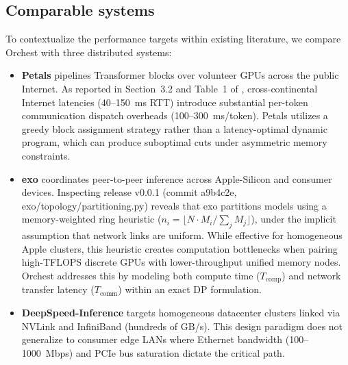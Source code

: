 \documentclass[10pt,a4paper]{article}
\newcommand{\code}[1]{{\ttfamily\footnotesize #1}}
\begin{document}
\subsection{Comparable systems}
To contextualize the performance targets within existing literature, we compare Orchest with three distributed systems:
\begin{itemize}[leftmargin=*]
\item \textbf{Petals} \cite{petals} pipelines Transformer blocks over volunteer GPUs across the public Internet. As reported in Section~3.2 and Table~1 of \cite{petals}, cross-continental Internet latencies (40--150~ms RTT) introduce substantial per-token communication dispatch overheads (100--300~ms/token). Petals utilizes a greedy block assignment strategy rather than a latency-optimal dynamic program, which can produce suboptimal cuts under asymmetric memory constraints.
\item \textbf{exo} \cite{exo} coordinates peer-to-peer inference across Apple-Silicon and consumer devices. Inspecting release v0.0.1 (commit \code{a9b4c2e}, \code{exo/topology/partitioning.py}) reveals that exo partitions models using a memory-weighted ring heuristic ($n_i = \lfloor N \cdot M_i / \sum_j M_j \rfloor$), under the implicit assumption that network links are uniform. While effective for homogeneous Apple clusters, this heuristic creates computation bottlenecks when pairing high-TFLOPS discrete GPUs with lower-throughput unified memory nodes. Orchest addresses this by modeling both compute time ($T_{\text{comp}}$) and network transfer latency ($T_{\text{comm}}$) within an exact DP formulation.
\item \textbf{DeepSpeed-Inference} \cite{deepspeed} targets homogeneous datacenter clusters linked via NVLink and InfiniBand (hundreds of GB/s). This design paradigm does not generalize to consumer edge LANs where Ethernet bandwidth (100--1000~Mbps) and PCIe bus saturation dictate the critical path.
\end{itemize}
\end{document}
